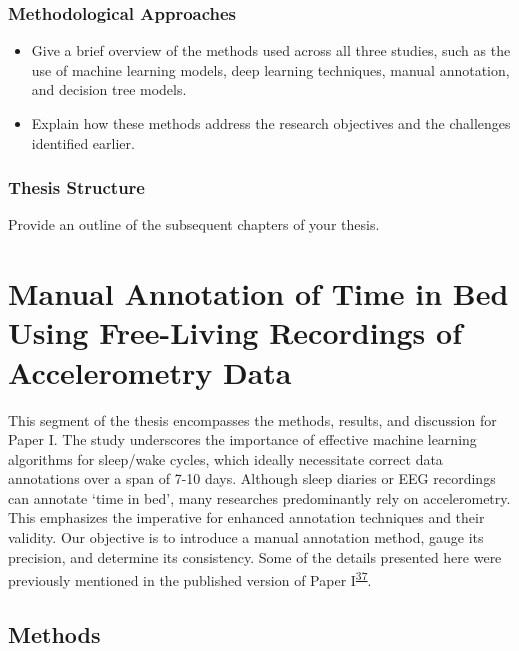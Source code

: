 \documentclass[
  9pt,
]{article}
\begin{document}
\hypertarget{methodological-approaches}{%
\subsubsection{Methodological
Approaches}\label{methodological-approaches}}

\begin{itemize}
\item
  Give a brief overview of the methods used across all three studies,
  such as the use of machine learning models, deep learning techniques,
  manual annotation, and decision tree models.
\item
  Explain how these methods address the research objectives and the
  challenges identified earlier.
\end{itemize}

\hypertarget{thesis-structure}{%
\subsubsection{Thesis Structure}\label{thesis-structure}}

Provide an outline of the subsequent chapters of your thesis.

\newpage

\hypertarget{manual-annotation-of-time-in-bed-using-free-living-recordings-of-accelerometry-data}{%
\section{Manual Annotation of Time in Bed Using Free-Living Recordings
of Accelerometry
Data}\label{manual-annotation-of-time-in-bed-using-free-living-recordings-of-accelerometry-data}}

This segment of the thesis encompasses the methods, results, and
discussion for Paper I. The study underscores the importance of
effective machine learning algorithms for sleep/wake cycles, which
ideally necessitate correct data annotations over a span of 7-10 days.
Although sleep diaries or EEG recordings can annotate `time in bed',
many researches predominantly rely on accelerometry. This emphasizes the
imperative for enhanced annotation techniques and their validity. Our
objective is to introduce a manual annotation method, gauge its
precision, and determine its consistency. Some of the details presented
here were previously mentioned in the published version of Paper
I\textsuperscript{\protect\hyperlink{ref-skovgaard_manual_2021}{37}}.

\hypertarget{methods}{%
\subsection{Methods}\label{methods}}
\end{document}
